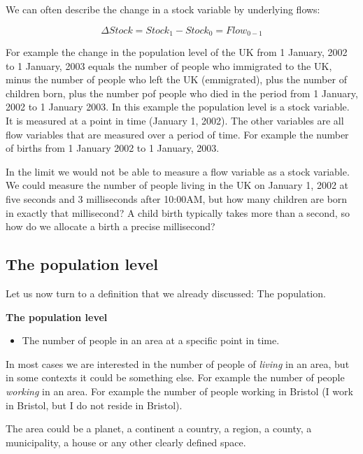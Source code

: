 \documentclass[]{book}
\providecommand{\tightlist}{%
  \setlength{\itemsep}{0pt}\setlength{\parskip}{0pt}}
\newenvironment{myblock}%
{%
 \begin{tcolorbox}%
}%
{\end{tcolorbox}}%
\begin{document}
We can often describe the change in a stock variable by underlying flows:

\[ \Delta Stock=Stock_{1}-Stock_{0}=Flow_{0-1} \]

For example the change in the population level of the UK from 1 January, 2002 to 1 January, 2003 equals the number of people who immigrated to the UK, minus the number of people who left the UK (emmigrated), plus the number of children born, plus the number pof people who died in the period from 1 January, 2002 to 1 January 2003. In this example the population level is a stock variable. It is measured at a point in time (January 1, 2002). The other variables are all flow variables that are measured over a period of time. For example the number of births from 1 January 2002 to 1 January, 2003.

In the limit we would not be able to measure a flow variable as a stock variable. We could measure the number of people living in the UK on January 1, 2002 at five seconds and 3 milliseconds after 10:00AM, but how many children are born in exactly that millisecond? A child birth typically takes more than a second, so how do we allocate a birth a precise millisecond?

\hypertarget{the-population-level}{%
\subsection{The population level}\label{the-population-level}}

Let us now turn to a definition that we already discussed: The population.

\begin{myblock}
\textbf{The population level}

\begin{itemize}
\tightlist
\item
  The number of people in an area at a specific point in time.
\end{itemize}
\end{myblock}

In most cases we are interested in the number of people of \emph{living} in an area, but in some contexts it could be something else. For example the number of people \emph{working} in an area. For example the number of people working in Bristol (I work in Bristol, but I do not reside in Bristol).

The area could be a planet, a continent a country, a region, a county, a municipality, a house or any other clearly defined space.
\end{document}
